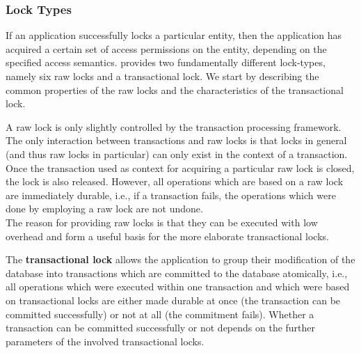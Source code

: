\documentclass[a4paper, 10pt]{book}
\begin{document}
                \subsubsection{Lock Types}


                If an application successfully locks a particular entity, then the
                application has acquired a certain set of access permissions on the
                entity, depending on the specified access semantics. \SYNEIGHT provides
                two fundamentally different lock-types, namely six raw locks and
                a transactional lock. We start by describing the common properties of
                the raw locks and the characteristics of the transactional lock.
                \begin{description}
                    \item[raw locks.] A raw lock is only slightly controlled by the
                        transaction processing framework. The only interaction between
                        transactions and raw locks is that locks in general (and thus raw
                        locks in particular) can only exist in the context of a transaction.
                        Once the transaction used as context for acquiring a particular raw
                        lock is closed, the lock is also released.
                        However, all operations which are based on a raw lock
                        are immediately durable, i.e., if a transaction fails, the
                        operations which were done by employing a raw lock are not
                        undone.\\
                        The reason for providing raw locks is that they can be executed with
                        low overhead and form a useful basis for the more elaborate
                        transactional locks. 
                    \item The \textbf{transactional lock} allows the application to group
                        their modification of the database into transactions which are
                        committed to the database atomically, i.e., all operations which
                        were executed within one transaction and which were based on
                        transactional locks are either made durable at once (the transaction
                        can be committed successfully) or not at all (the commitment fails).
                        Whether a transaction can be committed successfully or not depends
                        on the further parameters of the involved transactional locks. 
                        \end{description}
\end{document}
